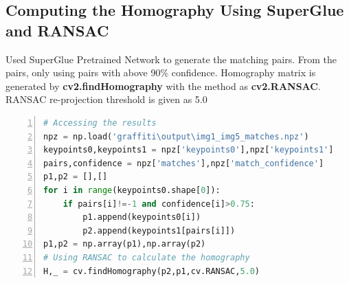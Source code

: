 \documentclass[11pt, a4paper]{article}
\begin{document}
\subsection{Computing the Homography Using SuperGlue and RANSAC}
Used SuperGlue Pretrained Network\cite{SuperGlue} to generate the matching pairs. From the pairs, only using pairs with above 90\% confidence. Homography matrix is generated by \textbf{cv2.findHomography} with the method as \textbf{cv2.RANSAC}. RANSAC re-projection threshold is given as 5.0
\begin{lstlisting}[numbers=left,frame=single,language=python,caption=Using points from SuperGlue for homography generation]
# Accessing the results
npz = np.load('graffiti\output\img1_img5_matches.npz')
keypoints0,keypoints1 = npz['keypoints0'],npz['keypoints1']
pairs,confidence = npz['matches'],npz['match_confidence']
p1,p2 = [],[]
for i in range(keypoints0.shape[0]):
    if pairs[i]!=-1 and confidence[i]>0.75:
        p1.append(keypoints0[i])
        p2.append(keypoints1[pairs[i]])
p1,p2 = np.array(p1),np.array(p2)
# Using RANSAC to calculate the homography
H,_ = cv.findHomography(p2,p1,cv.RANSAC,5.0)
\end{lstlisting}
\end{document}

